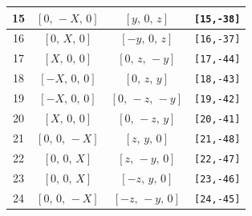 \documentclass[fleqn,8pt]{jsarticle}
\begin{document}
\begin{longtable}{cccc}
15 & $\left[ 0,\, - X,\, 0 \right]$ & $\left[ y,\, 0,\, z \right]$ & {\tt [15,-38]} \\ \hline
16 & $\left[ 0,\, X,\, 0 \right]$ & $\left[ - y,\, 0,\, z \right]$ & {\tt [16,-37]} \\ \hline
17 & $\left[ X,\, 0,\, 0 \right]$ & $\left[ 0,\, z,\, - y \right]$ & {\tt [17,-44]} \\ \hline
18 & $\left[ - X,\, 0,\, 0 \right]$ & $\left[ 0,\, z,\, y \right]$ & {\tt [18,-43]} \\ \hline
19 & $\left[ - X,\, 0,\, 0 \right]$ & $\left[ 0,\, - z,\, - y \right]$ & {\tt [19,-42]} \\ \hline
20 & $\left[ X,\, 0,\, 0 \right]$ & $\left[ 0,\, - z,\, y \right]$ & {\tt [20,-41]} \\ \hline
21 & $\left[ 0,\, 0,\, - X \right]$ & $\left[ z,\, y,\, 0 \right]$ & {\tt [21,-48]} \\ \hline
22 & $\left[ 0,\, 0,\, X \right]$ & $\left[ z,\, - y,\, 0 \right]$ & {\tt [22,-47]} \\ \hline
23 & $\left[ 0,\, 0,\, X \right]$ & $\left[ - z,\, y,\, 0 \right]$ & {\tt [23,-46]} \\ \hline
24 & $\left[ 0,\, 0,\, - X \right]$ & $\left[ - z,\, - y,\, 0 \right]$ & {\tt [24,-45]} \\
\end{longtable}
\renewcommand{\arraystretch}{1.2}
\end{document}
